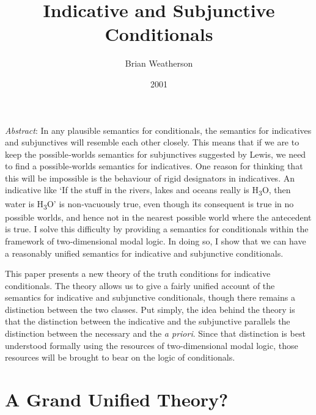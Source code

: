 \documentclass[
  11pt,
  letterpaper,
  DIV=11,
  numbers=noendperiod,
  twoside]{scrartcl}
\title{Indicative and Subjunctive Conditionals}
\author{Brian Weatherson}
\date{2001}
\renewenvironment{abstract}
 {\vspace{-1.25cm}
 \quotation\small\noindent\emph{Abstract}:}
 {\endquotation}
\begin{document}
\maketitle
\begin{abstract}
In any plausible semantics for conditionals, the semantics for
indicatives and subjunctives will resemble each other closely. This
means that if we are to keep the possible‐worlds semantics for
subjunctives suggested by Lewis, we need to find a possible‐worlds
semantics for indicatives. One reason for thinking that this will be
impossible is the behaviour of rigid designators in indicatives. An
indicative like `If the stuff in the rivers, lakes and oceans really is
H\textsubscript{3}O, then water is H\textsubscript{3}O' is non‐vacuously
true, even though its consequent is true in no possible worlds, and
hence not in the nearest possible world where the antecedent is true. I
solve this difficulty by providing a semantics for conditionals within
the framework of two‐dimensional modal logic. In doing so, I show that
we can have a reasonably unified semantics for indicative and
subjunctive conditionals.
\end{abstract}


This paper presents a new theory of the truth conditions for indicative
conditionals. The theory allows us to give a fairly unified account of
the semantics for indicative and subjunctive conditionals, though there
remains a distinction between the two classes. Put simply, the idea
behind the theory is that the distinction between the indicative and the
subjunctive parallels the distinction between the necessary and the
\emph{a priori}. Since that distinction is best understood formally
using the resources of two-dimensional modal logic, those resources will
be brought to bear on the logic of conditionals.

\section{A Grand Unified Theory?}\label{a-grand-unified-theory}
\end{document}
